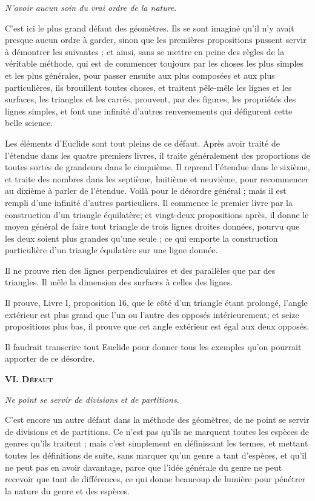 	\emph{N'avoir aucun soin du vrai ordre de la nature}.

C'est ici le plus grand défaut des géomètres. Ils se sont imaginé qu'il n'y avait presque aucun ordre à garder, sinon que les premières propositions pussent servir à démontrer les suivantes ; et ainsi, sans se mettre en peine des règles de la véritable méthode, qui est de commencer toujours par les choses les plus simples et les plus générales, pour passer ensuite aux plus composées et aux plus particulières, ils brouillent toutes choses, et traitent pêle-mêle les lignes et les surfaces, les triangles et les carrés, prouvent, par des figures, les propriétés des lignes simples, et font une infinité d'autres renversements qui défigurent cette belle science.

Les éléments d'Euclide sont tout pleins de ce défaut. Après avoir traité de l'étendue dans les quatre premiers livres, il traite généralement des proportions de toutes sortes de grandeurs dans le cinquième. Il reprend l'étendue dans le sixième, et traite des nombres dans les septième, huitième et neuvième, pour recommencer au dixième à parler de l'étendue. Voilà pour le désordre général ; mais il est rempli d'une infinité d'autres particuliers. Il commence le premier livre par la construction d'un triangle équilatère; et vingt-deux propositions après, il donne le moyen général de faire tout triangle de trois lignes droites données, pourvu que les deux soient plus grandes qu'une seule ; ce qui emporte la construction particulière d'un triangle équilatère sur une ligne donnée.

Il ne prouve rien des lignes perpendiculaires et des parallèles que par des triangles. Il mêle la dimension des surfaces à celles des lignes.

Il prouve, Livre I, proposition 16, que le côté d'un triangle étant prolongé, l'angle extérieur est plus grand que l'un ou l'autre des opposés intérieurement; et seize propositions plus bas, il prouve que cet angle extérieur est égal aux deux opposés.

Il faudrait transcrire tout Euclide pour donner tous les exemples qu'on pourrait apporter de ce désordre.


\begin{center}{\bfseries\scshape VI. Défaut}\end{center}

	\emph{Ne point se servir de divisions et de partitions}.

C'est encore un autre défaut dans la méthode des géomètres, de ne point se servir de divisions et de partitions. Ce n'est pas qu'ils ne marquent toutes les espèces de genres qu'ils traitent ; mais c'est simplement en définissant les termes, et mettant toutes les définitions de suite, sans marquer qu'un genre a tant d'espèces, et qu'il ne peut pas en avoir davantage, parce que l'idée générale du genre ne peut recevoir que tant de différences, ce qui donne beaucoup de lumière pour pénétrer la nature du genre et des espèces.


